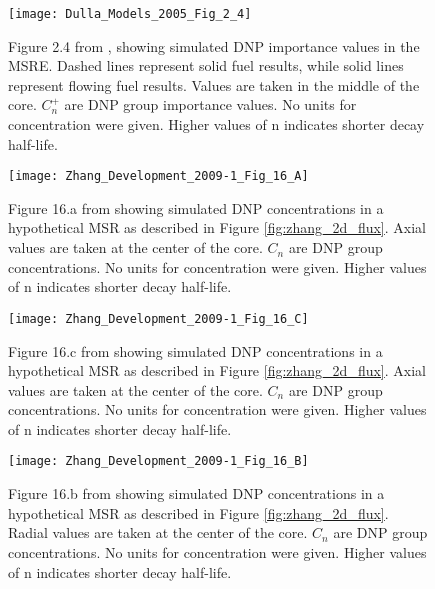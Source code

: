 \documentclass[review]{elsarticle}
\begin{document}
\begin{figure}[H]
   \centering
   \texttt{[image: Dulla\_Models\_2005\_Fig\_2\_4]}
   \caption{Figure 2.4 from \cite{dulla_models_2005}, showing simulated DNP
    importance values in the
    MSRE. Dashed lines represent
    solid fuel results, while solid lines represent flowing fuel results. Values
    are taken in the middle of the core. $C_{n}^{+}$ are DNP group importance values. 
    No units for concentration were given. Higher values of n indicates shorter
    decay half-life.}
   \label{fig:dulla_msre_dnp_importance}
\end{figure}

\begin{figure}[H]
   \centering
   \texttt{[image: Zhang\_Development\_2009-1\_Fig\_16\_A]}
   \caption{Figure 16.a from \cite{zhang_development_2009-1} showing simulated
                DNP concentrations
               in a hypothetical MSR as described in Figure \ref{fig:zhang_2d_flux}.
               Axial
               values are taken at the center of the core. $C_{n}$ are DNP
               group concentrations. No units for concentration were given.
                Higher values of n indicates
               shorter decay half-life.}
   \label{fig:zhang_axial_velocity_dnp_1}
\end{figure}

\begin{figure}[H]
   \centering
   \texttt{[image: Zhang\_Development\_2009-1\_Fig\_16\_C]}
   \caption{Figure 16.c from \cite{zhang_development_2009-1} showing simulated DNP concentrations
               in a hypothetical MSR as described in Figure \ref{fig:zhang_2d_flux}.
               Axial
               values are taken at the center of the core. $C_{n}$ are DNP
               group concentrations. No units for concentration were given.
               Higher values of n indicates shorter decay half-life.}
   \label{fig:zhang_axial_velocity_dnp_2}
\end{figure}

\begin{figure}[H]
   \centering
   \texttt{[image: Zhang\_Development\_2009-1\_Fig\_16\_B]}
   \caption{Figure 16.b from \cite{zhang_development_2009-1} showing simulated DNP concentrations
               in a hypothetical MSR as described in Figure \ref{fig:zhang_2d_flux}.
               Radial 
               values are taken at the center of the core. $C_{n}$ are DNP
               group concentrations. No units for concentration were given.
               Higher values of n indicates shorter decay half-life.}
   \label{fig:zhang_radial_velocity_dnp_1}
\end{figure}
\end{document}
